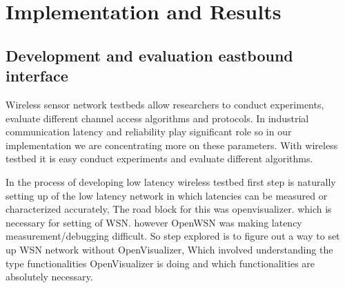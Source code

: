 \chapter{Implementation and Results}



\section{Development and evaluation eastbound interface}
\setcounter{secnumdepth}{3}
Wireless sensor network testbeds allow researchers to conduct experiments, evaluate different channel access algorithms and protocols. In industrial communication latency and reliability play significant role so in our implementation we are concentrating more on these parameters. With wireless testbed it is easy conduct experiments and evaluate different algorithms.

In the process of developing low latency wireless testbed first step is naturally setting up of the low latency network in which latencies can be measured or characterized accurately, The road block for this was openvisualizer. which is necessary for setting of WSN. however OpenWSN was making latency measurement/debugging difficult. So step explored is to figure out a way to set up WSN network without OpenVisualizer, Which involved understanding the type functionalities OpenVisualizer is doing and which functionalities are absolutely necessary.

